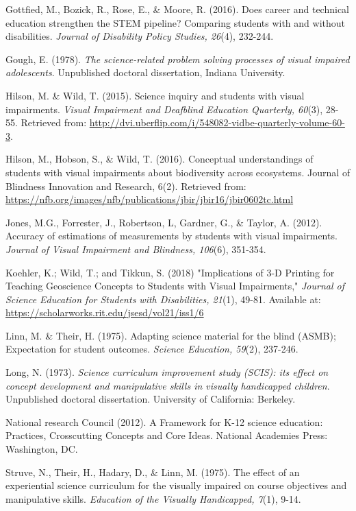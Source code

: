 \documentclass[11.5pt]{sig-alternate} %
\begin{document}
Gottfied, M., Bozick, R., Rose, E., \& Moore, R.  (2016).  Does career and technical education strengthen the STEM pipeline?  Comparing students with and without disabilities.  \textit{Journal of Disability Policy Studies, 26}(4), 232-244.

Gough, E. (1978). \textit{The science-related problem solving processes of visual impaired adolescents}. Unpublished doctoral dissertation, Indiana University.  

Hilson, M. \& Wild, T. (2015).  Science inquiry and students with visual impairments.  \textit{Visual Impairment and Deafblind Education Quarterly, 60}(3), 28-55.  Retrieved from: \url{http://dvi.uberflip.com/i/548082-vidbe-quarterly-volume-60-3}. 

Hilson, M., Hobson, S., \& Wild, T.  (2016).  Conceptual understandings of students with visual impairments about biodiversity across ecosystems.  Journal of Blindness Innovation and Research, 6(2).  Retrieved from: \url{https://nfb.org/images/nfb/publications/jbir/jbir16/jbir0602tc.html}

Jones, M.G., Forrester, J., Robertson, L, Gardner, G., \& Taylor, A. (2012).  Accuracy of estimations of measurements by students with visual impairments.  \textit{Journal of Visual Impairment and Blindness, 106}(6), 351-354. 

Koehler, K.; Wild, T.; and Tikkun, S. (2018) "Implications of 3-D Printing for Teaching Geoscience Concepts to Students with Visual Impairments," \textit{Journal of Science Education for Students with Disabilities, 21}(1), 49-81. Available at: \url{https://scholarworks.rit.edu/jsesd/vol21/iss1/6}

Linn, M. \& Their, H.  (1975).  Adapting science material for the blind (ASMB); Expectation for student outcomes. \textit{Science Education, 59}(2), 237-246. 

Long, N.  (1973).  \textit{Science curriculum improvement study (SCIS): its effect on concept development and manipulative skills in visually handicapped children}.  Unpublished doctoral dissertation.  University of California: Berkeley.   

National research Council (2012).  A Framework for K-12 science education: Practices, Crosscutting Concepts and Core Ideas.  National Academies Press: Washington, DC.

Struve, N., Their, H., Hadary, D., \& Linn, M.  (1975).  The effect of an experiential science curriculum for the visually impaired on course objectives and manipulative skills.  \textit{Education of the Visually Handicapped, 7}(1), 9-14.
\end{document}
